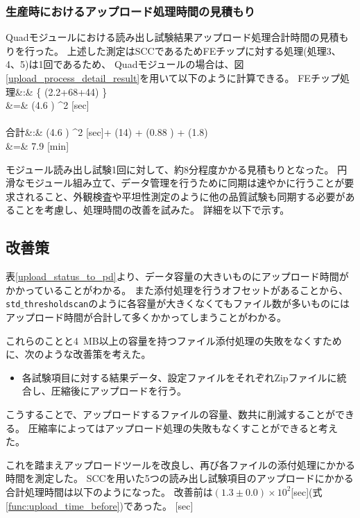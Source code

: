 \newpage
\subsubsection{生産時におけるアップロード処理時間の見積もり}
Quadモジュールにおける読み出し試験結果アップロード処理合計時間の見積もりを行った。
上述した測定はSCCであるためFEチップに対する処理(処理3、4、5)は1回であるため、
Quadモジュールの場合は、図\ref{upload_process_detail_result}を用いて以下のように計算できる。
\bbb
{\rm FE}チップ処理&:& \left\{ (2.2+68+44) \pm {}  \right\} \nonumber \\
&=& (4.6  ) ^2 [{\rm sec}]\\\nonumber\\
合計&:& (4.6  ) ^2 [\rm{sec}]+ (14) + (0.88 ) + (1.8) \nonumber \\
\label{func:upload_quad_before}
&=& 7.9  [{\rm min}]
\eee

モジュール読み出し試験1回に対して、約8分程度かかる見積もりとなった。
円滑なモジュール組み立て、データ管理を行うために同期は速やかに行うことが要求されること、外観検査や平坦性測定のように他の品質試験も同期する必要があることを考慮し、処理時間の改善を試みた。
詳細を以下で示す。

\subsection{改善策}

表\ref{upload_status_to_pd}より、データ容量の大きいものにアップロード時間がかかっていることがわかる。
また添付処理を行うオフセットがあることから、\texttt{std$\_$thresholdscan}のように各容量が大きくなくてもファイル数が多いものにはアップロード時間が合計して多くかかってしまうことがわかる。

これらのことと4~MB以上の容量を持つファイル添付処理の失敗をなくすために、次のような改善策を考えた。

\begin{itemize}
  \item 各試験項目に対する結果データ、設定ファイルをそれぞれZipファイルに統合し、圧縮後にアップロードを行う。
\end{itemize}

こうすることで、アップロードするファイルの容量、数共に削減することができる。
圧縮率によってはアップロード処理の失敗もなくすことができると考えた。

これを踏まえアップロードツールを改良し、再び各ファイルの添付処理にかかる時間を測定した。
SCCを用いた5つの読み出し試験項目のアップロードにかかる合計処理時間は以下のようになった。
改善前は$(1.3\pm 0.0)\times 10^2$[sec](式\ref{func:upload_time_before})であった。
  [{\rm sec}]
\eee

